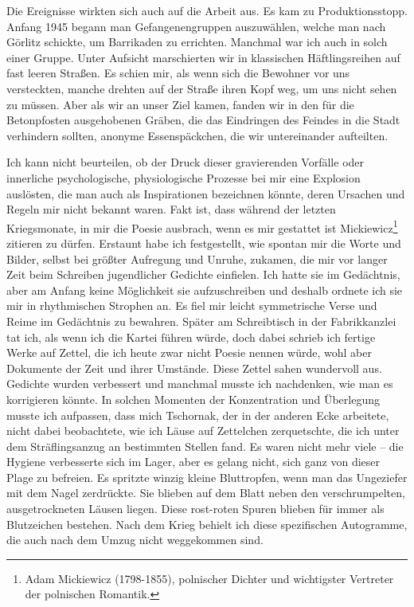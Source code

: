 \documentclass[a4paper,12pt,ngerman,
]{nisebook}
\begin{document}
Die Ereignisse wirkten sich auch auf die Arbeit aus. Es kam zu Produktionsstopp. Anfang 1945 begann man Gefangenengruppen auszuwählen, welche man nach Görlitz schickte, um Barrikaden zu errichten. Manchmal war ich auch in solch einer Gruppe. Unter Aufsicht marschierten wir in klassischen Häftlingsreihen auf fast leeren Straßen. Es schien mir, als wenn sich die Bewohner vor uns versteckten, manche drehten auf der Straße ihren Kopf weg, um uns nicht sehen zu müssen. Aber als wir an unser Ziel kamen, fanden wir in den für die Betonpfosten ausgehobenen Gräben, die das Eindringen des Feindes in die Stadt verhindern sollten, anonyme Essenspäckchen, die wir untereinander aufteilten.

Ich kann nicht beurteilen, ob der Druck dieser gravierenden Vorfälle oder innerliche psychologische, physiologische Prozesse bei mir eine Explosion auslösten, die man auch als Inspirationen bezeichnen könnte, deren Ursachen und Regeln mir nicht bekannt waren. Fakt ist, dass während der letzten Kriegsmonate, in mir die \glqq Poesie ausbrach\grqq, wenn es mir gestattet ist Mickiewicz\footnote{Adam Mickiewicz (1798-1855), polnischer Dichter und wichtigster Vertreter der polnischen Romantik.} zitieren zu dürfen. Erstaunt habe ich festgestellt, wie spontan mir die Worte und Bilder, selbst bei größter Aufregung und Unruhe, zukamen, die mir vor langer Zeit beim Schreiben jugendlicher Gedichte einfielen. Ich hatte sie im Gedächtnis, aber am Anfang keine Möglichkeit sie aufzuschreiben und deshalb ordnete ich sie mir in rhythmischen Strophen an. Es fiel mir leicht symmetrische Verse und Reime im Gedächtnis zu bewahren. Später am Schreibtisch in der Fabrikkanzlei tat ich, als wenn ich die Kartei führen würde, doch dabei schrieb ich fertige Werke auf Zettel, die ich heute zwar nicht Poesie nennen würde, wohl aber Dokumente der Zeit und ihrer Umstände. 
Diese Zettel sahen wundervoll aus. Gedichte wurden verbessert und manchmal musste ich nachdenken, wie man es korrigieren könnte. In solchen Momenten der Konzentration und Überlegung musste ich aufpassen, dass mich Tschornak, der in der anderen Ecke arbeitete, nicht dabei beobachtete, wie ich Läuse auf Zettelchen zerquetschte, die ich unter dem Sträflingsanzug an bestimmten Stellen fand. Es waren nicht mehr viele -- die Hygiene verbesserte sich im Lager, aber es gelang nicht, sich ganz von dieser Plage zu befreien. Es spritzte winzig kleine Bluttropfen, wenn man das Ungeziefer mit dem Nagel zerdrückte. Sie blieben auf dem Blatt neben den verschrumpelten, ausgetrockneten Läusen liegen. Diese rost-roten Spuren blieben für immer als Blutzeichen bestehen. Nach dem Krieg behielt ich diese spezifischen Autogramme, die auch nach dem Umzug nicht weggekommen sind.
\end{document}
